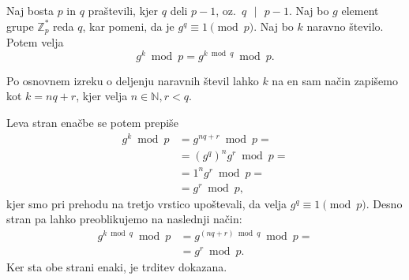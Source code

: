 \documentclass[isrm2, tisk]{fmfdelo}
\newcommand{\N}{\mathbb N}
\newcommand{\Z}{\mathbb Z}
\begin{document}
\begin{trditev}
\label{trd:mod-q}
    Naj bosta $p$ in $q$ praštevili, kjer $q$ deli $p - 1$, oz.\ $q \text{ }|\text{ } p - 1$. Naj
    bo $g$ element grupe $\Z_p^*$ reda $q$, kar pomeni, da je $g^q \equiv 1 \pmod p$. Naj bo $k$
    naravno število. Potem velja 
    $$ 
    g^k \bmod p = g^{k \bmod q} \bmod p.
    $$
\end{trditev}
\begin{dokaz}
    Po osnovnem izreku o deljenju naravnih števil lahko $k$ na en sam način zapišemo kot $k = nq + r$, 
    kjer velja $n \in \N, r < q$.

    Leva stran enačbe se potem prepiše 
    \begin{align*}
        g^k \bmod p &= g^{nq + r} \bmod p = \\
                    &= (g^q)^n g^r \bmod p = \\
                    &= 1^n g^r \bmod p = \\
                    &= g^r \bmod p,
    \end{align*}
    kjer smo pri prehodu na tretjo vrstico upoštevali, da velja $g^q \equiv 1 \pmod p$. Desno stran
    pa lahko preoblikujemo na naslednji način:
    \begin{align*}
        g^{k \bmod q} \bmod p &= g^{(nq + r) \bmod q} \bmod p = \\ 
                              &= g^r \bmod p.
    \end{align*}
    Ker sta obe strani enaki, je trditev dokazana.
\end{dokaz}
\end{document}
